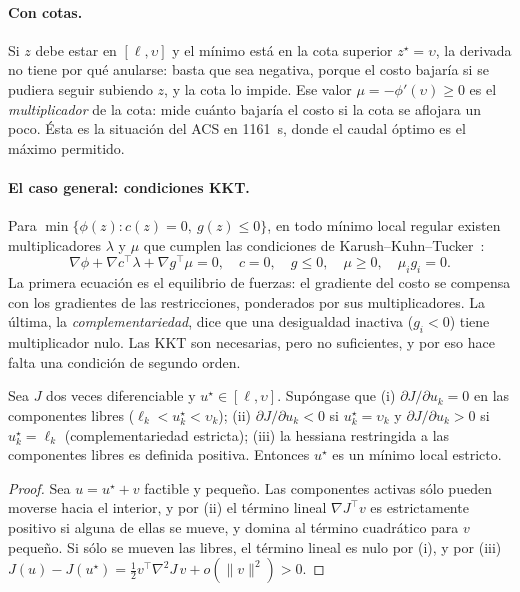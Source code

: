 \paragraph{Con cotas.} Si $z$ debe estar en $[\ell,\upsilon]$ y el mínimo está en la cota
superior $z^\star=\upsilon$, la derivada no tiene por qué anularse: basta que sea negativa, porque
el costo bajaría si se pudiera seguir subiendo $z$, y la cota lo impide. Ese valor
$\mu=-\phi'(\upsilon)\ge0$ es el \emph{multiplicador} de la cota: mide cuánto bajaría el costo si
la cota se aflojara un poco. Ésta es la situación del ACS en 1161~s, donde el caudal óptimo es
el máximo permitido.

\paragraph{El caso general: condiciones KKT.} Para $\min\{\phi(z):c(z)=0,\ g(z)\le0\}$, en todo
mínimo local regular existen multiplicadores $\lambda$ y $\mu$ que cumplen las condiciones de
Karush--Kuhn--Tucker~\cite{nocedal2006}:
\[
\nabla\phi+\nabla c^\top\lambda+\nabla g^\top\mu=0,\quad c=0,\quad g\le0,\quad \mu\ge0,\quad \mu_ig_i=0.
\]
La primera ecuación es el equilibrio de fuerzas: el gradiente del costo se compensa con los
gradientes de las restricciones, ponderados por sus multiplicadores. La última, la
\emph{complementariedad}, dice que una desigualdad inactiva ($g_i<0$) tiene multiplicador
nulo. Las KKT son necesarias, pero no suficientes, y por eso hace falta una condición de
segundo orden.

\begin{proposicion}\label{prop:sosc}
Sea $J$ dos veces diferenciable y $u^\star\in[\ell,\upsilon]$. Supóngase que (i)
$\partial J/\partial u_k=0$ en las componentes libres ($\ell_k<u^\star_k<\upsilon_k$);
(ii) $\partial J/\partial u_k<0$ si $u^\star_k=\upsilon_k$ y $\partial J/\partial u_k>0$ si
$u^\star_k=\ell_k$ (complementariedad estricta); (iii) la hessiana restringida a las
componentes libres es definida positiva. Entonces $u^\star$ es un mínimo local estricto.
\end{proposicion}
\begin{proof}
Sea $u=u^\star+v$ factible y pequeño. Las componentes activas sólo pueden moverse hacia el
interior, y por (ii) el término lineal $\nabla J^\top v$ es estrictamente positivo si alguna de
ellas se mueve, y domina al término cuadrático para $v$ pequeño. Si sólo se mueven las libres,
el término lineal es nulo por (i), y por (iii)
$J(u)-J(u^\star)=\tfrac12v^\top\nabla^2J\,v+o(\|v\|^2)>0$.
\end{proof}

